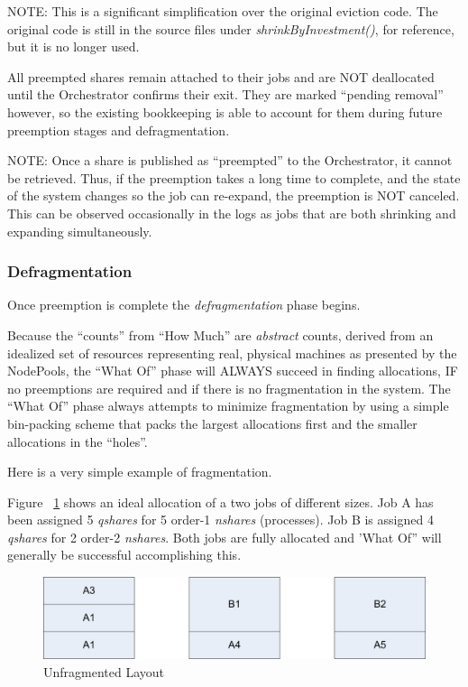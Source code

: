    NOTE: This is a significant simplification over the original eviction code.  The original code is still
   in the source files under {\em shrinkByInvestment()}, for reference, but it is no longer used.

   All preempted shares remain attached to their jobs and are NOT deallocated until the Orchestrator 
   confirms their exit.  They are marked ``pending removal'' however, so the existing bookkeeping is able
   to account for them during future preemption stages and defragmentation.

   NOTE: Once a share is published as ``preempted'' to the Orchestrator, it cannot be retrieved.  Thus, if
   the preemption takes a long time to complete, and the state of the system changes so the job can
   re-expand, the preemption is NOT canceled.  This can be observed occasionally in the logs as
   jobs that are both shrinking and expanding simultaneously.

\subsubsection{Defragmentation}

  Once preemption is complete the {\em defragmentation} phase begins.

  Because the ``counts'' from ``How Much'' are {\em abstract} counts, derived from an idealized set
  of resources representing real, physical machines as presented by the NodePools, the ``What Of''
  phase will ALWAYS succeed in finding allocations, IF no preemptions are required and if there is no
  fragmentation in the system.  The ``What Of'' phase always attempts to minimize fragmentation by
  using a simple bin-packing scheme that packs the largest allocations first and the smaller
  allocations in the ``holes''.

  Here is a very simple example of fragmentation.

  Figure ~\ref{fig:rm-fragmentation-1} shows an ideal allocation of a two jobs of different sizes.  Job A has been
  assigned 5 {\em qshares} for 5 order-1 {\em nshares} (processes).  Job B is assigned
  4 {\em qshares} for 2 order-2 {\em nshares}.  Both jobs are fully allocated and 'What Of''
  will generally be successful accomplishing this.

    \begin{figure}[H]
      \centering
      \includegraphics[width=5.5in]{images/ducc-internals/rm-structure-1.png}
      \caption{Unfragmented Layout}
      \label{fig:rm-fragmentation-1}
    \end{figure}

